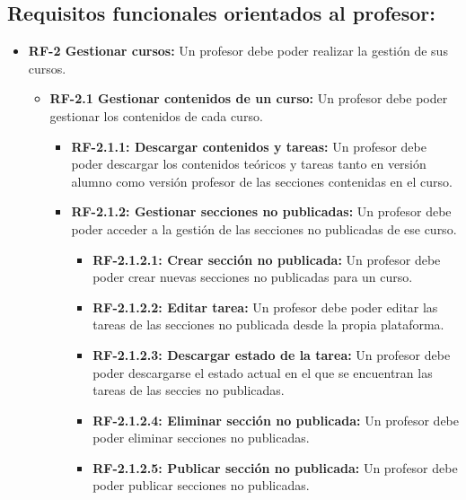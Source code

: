 \subsection{Requisitos funcionales orientados al profesor:}
\begin{itemize}
\tightlist

\item
  \textbf{RF-2 Gestionar cursos:} Un profesor debe poder realizar la gestión de sus cursos.
  
  \begin{itemize}
  \tightlist
  \item
    \textbf{RF-2.1 Gestionar contenidos de un curso:} Un profesor debe poder gestionar los contenidos de cada curso.

    \begin{itemize}
    \tightlist
    \item
      \textbf{RF-2.1.1: Descargar contenidos y tareas:} Un profesor debe poder descargar los contenidos teóricos y tareas tanto en versión alumno como versión profesor de las secciones contenidas en el curso.
      
    \item  
      \textbf{RF-2.1.2: Gestionar secciones no publicadas:} Un profesor debe poder acceder a la gestión de las secciones no publicadas de ese curso.
      
      \begin{itemize}
      \tightlist
      \item
        \textbf{RF-2.1.2.1: Crear sección no publicada:} Un profesor debe poder crear nuevas secciones no publicadas para un curso.
        
      \item
        \textbf{RF-2.1.2.2: Editar tarea:} Un profesor debe poder editar las tareas de las secciones no publicada desde la propia plataforma.
        
      \item
        \textbf{RF-2.1.2.3: Descargar estado de la tarea:} Un profesor debe poder descargarse el estado actual en el que se encuentran las tareas de las seccies no publicadas.
        
      \item
        \textbf{RF-2.1.2.4: Eliminar sección no publicada:} Un profesor debe poder eliminar secciones no publicadas.
        
      \item
        \textbf{RF-2.1.2.5: Publicar sección no publicada:} Un profesor debe poder publicar secciones no publicadas.
      

\end{itemize}
\end{itemize}
\end{itemize}
\end{itemize}
